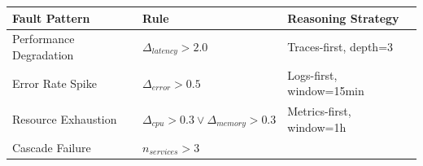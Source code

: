 \begin{longtable}[]{@{}lll@{}}
\toprule
\begin{minipage}[b]{0.34\columnwidth}\raggedright
Fault Pattern\strut
\end{minipage} & \begin{minipage}[b]{0.14\columnwidth}\raggedright
Rule\strut
\end{minipage} & \begin{minipage}[b]{0.43\columnwidth}\raggedright
Reasoning Strategy\strut
\end{minipage}\tabularnewline
\midrule
\endhead
\begin{minipage}[t]{0.34\columnwidth}\raggedright
Performance Degradation\strut
\end{minipage} & \begin{minipage}[t]{0.14\columnwidth}\raggedright
\(\Delta_{latency} > 2.0\)\strut
\end{minipage} & \begin{minipage}[t]{0.43\columnwidth}\raggedright
Traces-first, depth=3\strut
\end{minipage}\tabularnewline
\begin{minipage}[t]{0.34\columnwidth}\raggedright
Error Rate Spike\strut
\end{minipage} & \begin{minipage}[t]{0.14\columnwidth}\raggedright
\(\Delta_{error} > 0.5\)\strut
\end{minipage} & \begin{minipage}[t]{0.43\columnwidth}\raggedright
Logs-first, window=15min\strut
\end{minipage}\tabularnewline
\begin{minipage}[t]{0.34\columnwidth}\raggedright
Resource Exhaustion\strut
\end{minipage} & \begin{minipage}[t]{0.14\columnwidth}\raggedright
\(\Delta_{cpu} > 0.3 \lor \Delta_{memory} > 0.3\)\strut
\end{minipage} & \begin{minipage}[t]{0.43\columnwidth}\raggedright
Metrics-first, window=1h\strut
\end{minipage}\tabularnewline
\begin{minipage}[t]{0.34\columnwidth}\raggedright
Cascade Failure\strut
\end{minipage} & \begin{minipage}[t]{0.14\columnwidth}\raggedright
\(n_{services} > 3\)\strut
\end{minipage} & \begin{minipage}[t]{0.43\columnwidth}\raggedright

\end{minipage}
\end{longtable}
